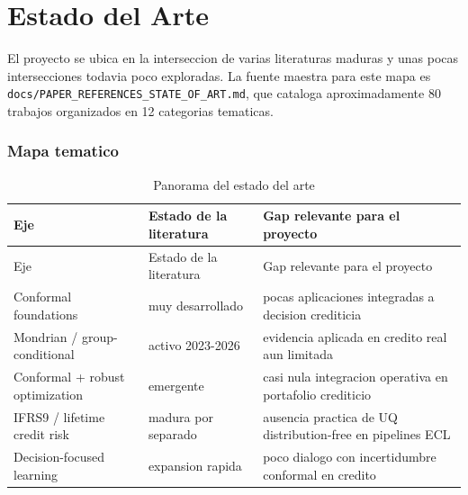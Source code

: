 \documentclass[
  spanish,
  11pt,
  letterpaper,
]{scrbook}
\theoremstyle{plain}
\theoremstyle{remark}
\begin{document}
\chapter{Estado del Arte}\label{sec-state-of-art}

El proyecto se ubica en la interseccion de varias literaturas maduras y
unas pocas intersecciones todavia poco exploradas. La fuente maestra
para este mapa es \texttt{docs/PAPER\_REFERENCES\_STATE\_OF\_ART.md},
que cataloga aproximadamente 80 trabajos organizados en 12 categorias
tematicas.

\subsection{Mapa tematico}\label{mapa-tematico}

\begin{longtable}[]{@{}
  >{\raggedright\arraybackslash}p{}
  >{\raggedright\arraybackslash}p{}
  >{\raggedright\arraybackslash}p{}@{}}
\caption{Panorama del estado del
arte}\label{tbl-state-art}\tabularnewline
\toprule\noalign{}
\begin{minipage}[b]{\linewidth}\raggedright
Eje
\end{minipage} & \begin{minipage}[b]{\linewidth}\raggedright
Estado de la literatura
\end{minipage} & \begin{minipage}[b]{\linewidth}\raggedright
Gap relevante para el proyecto
\end{minipage} \\
\midrule\noalign{}
\endfirsthead
\toprule\noalign{}
\begin{minipage}[b]{\linewidth}\raggedright
Eje
\end{minipage} & \begin{minipage}[b]{\linewidth}\raggedright
Estado de la literatura
\end{minipage} & \begin{minipage}[b]{\linewidth}\raggedright
Gap relevante para el proyecto
\end{minipage} \\
\midrule\noalign{}
\endhead
\bottomrule\noalign{}
\endlastfoot
Conformal foundations & muy desarrollado & pocas aplicaciones integradas
a decision crediticia \\
Mondrian / group-conditional & activo 2023-2026 & evidencia aplicada en
credito real aun limitada \\
Conformal + robust optimization & emergente & casi nula integracion
operativa en portafolio crediticio \\
IFRS9 / lifetime credit risk & madura por separado & ausencia practica
de UQ distribution-free en pipelines ECL \\
Decision-focused learning & expansion rapida & poco dialogo con
incertidumbre conformal en credito \\
\end{longtable}
\end{document}
